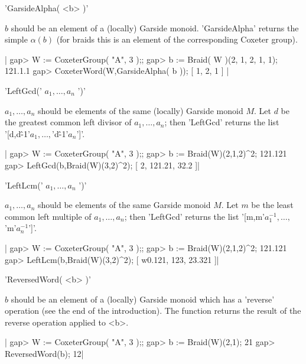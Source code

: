 
'GarsideAlpha( <b> )'

$b$ should be  an element of a (locally)  Garside monoid. 'GarsideAlpha'
returns the  simple $\alpha(b)$ (for  braids this  is an element  of the
corresponding Coxeter group).

|    gap>  W := CoxeterGroup( "A", 3 );;
    gap>  b := Braid( W )(2, 1, 2, 1, 1);
    121.1.1
    gap> CoxeterWord(W,GarsideAlpha( b ));
    [ 1, 2, 1 ] |


'LeftGcd(' $a_1,\ldots,a_n$ ')'

$a_1,\ldots,a_n$  should be elements  of the same  (locally) Garside monoid
$M$.  Let $d$ be the greatest common left divisor of $a_1,\ldots,a_n$; then
'LeftGcd' returns the list '[d,d\^-1\*'$a_1,\ldots,$'d\^-1\*'$a_n$']'.

|    gap>  W := CoxeterGroup( "A", 3 );;
    gap>  b := Braid(W)(2,1,2)^2;
    121.121
    gap> LeftGcd(b,Braid(W)(3,2)^2);
    [ 2, 121.21, 32.2 ]|


'LeftLcm(' $a_1,\ldots,a_n$ ')'

$a_1,\ldots,a_n$ should be elements of the same Garside monoid $M$. Let $m$
be  the  least  common  left  multiple  of $a_1,\ldots,a_n$; then 'LeftGcd'
returns the list '[m,m\*'$a_1^{-1},\ldots,$'m\*'$a_n^{-1}$']'.

|    gap>  W := CoxeterGroup( "A", 3 );;
    gap>  b := Braid(W)(2,1,2)^2;
    121.121
    gap> LeftLcm(b,Braid(W)(3,2)^2);
    [ w0.121, 123, 23.321 ]|


'ReversedWord( <b> )'

$b$  should be  an element  of a  (locally) Garside  monoid which  has a
'reverse'  operation (see  the end  of the  introduction). The  function
returns the result of the reverse operation applied to <b>.

|    gap>  W := CoxeterGroup( "A", 3 );;
    gap>  b := Braid(W)(2,1);
    21
    gap> ReversedWord(b);
    12|

